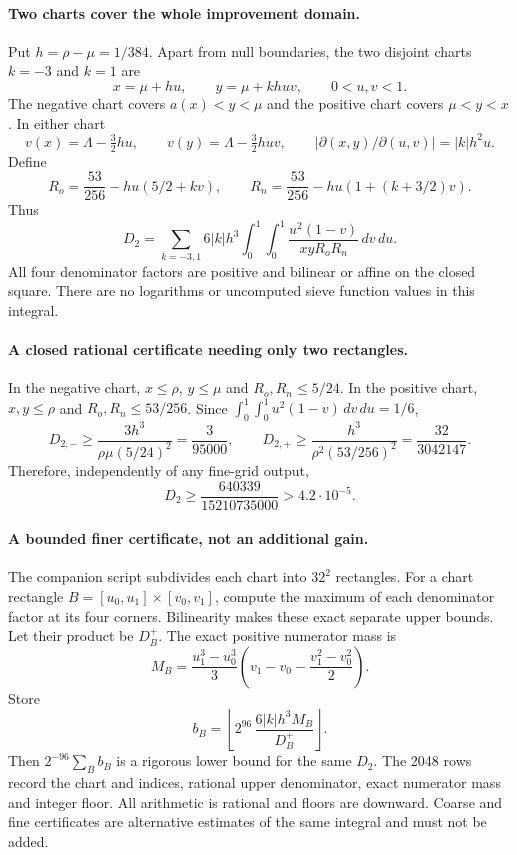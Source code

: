 \paragraph{Two charts cover the whole improvement domain.}
Put $h=\rho-\mu=1/384$. Apart from null boundaries, the two disjoint
charts $k=-3$ and $k=1$ are
\[
 x=\mu+hu,\qquad y=\mu+khuv,\qquad 0<u,v<1.
\]
The negative chart covers $a(x)<y<\mu$ and the positive chart covers
$\mu<y<x$. In either chart
\[
 v(x)=\Lambda-\tfrac32hu,\qquad
 v(y)=\Lambda-\tfrac32huv,\qquad
 |\partial(x,y)/\partial(u,v)|=|k|h^2u.
\]
Define
\[
 R_o=\frac{53}{256}-hu(5/2+kv),\qquad
 R_n=\frac{53}{256}-hu(1+(k+3/2)v).
\]
Thus
\begin{equation}\label{eq:second-prefix-chart-integral}
 D_2=\sum_{k=-3,1}6|k|h^3
 \int_0^1\int_0^1\frac{u^2(1-v)}{xyR_oR_n}\,dv\,du.
\end{equation}
All four denominator factors are positive and bilinear or affine
on the closed square. There are no logarithms or uncomputed sieve
function values in this integral.

\paragraph{A closed rational certificate needing only two rectangles.}
In the negative chart,
$x\le\rho$, $y\le\mu$ and $R_o,R_n\le5/24$.
In the positive chart,
$x,y\le\rho$ and $R_o,R_n\le53/256$.
Since $\int_0^1\int_0^1u^2(1-v)\,dv\,du=1/6$,
\[
 D_{2,-}\ge\frac{3h^3}{\rho\mu(5/24)^2}=\frac3{95000},
 \qquad
 D_{2,+}\ge\frac{h^3}{\rho^2(53/256)^2}=\frac{32}{3042147}.
\]
Therefore, independently of any fine-grid output,
\begin{equation}\label{eq:second-prefix-coarse-positive}
 \boxed{D_2\ge\frac{640339}{15210735000}>4.2\cdot10^{-5}.}
\end{equation}

\paragraph{A bounded finer certificate, not an additional gain.}
The companion script subdivides each chart into $32^2$ rectangles.
For a chart rectangle $B=[u_0,u_1]\times[v_0,v_1]$, compute the maximum
of each denominator factor at its four corners. Bilinearity makes
these exact separate upper bounds. Let their product be $D_B^+$.
The exact positive numerator mass is
\[
 M_B=\frac{u_1^3-u_0^3}{3}
       \left(v_1-v_0-\frac{v_1^2-v_0^2}{2}\right).
\]
Store
\[
 b_B=\left\lfloor 2^{96}\,
                 \frac{6|k|h^3 M_B}{D_B^+}\right\rfloor.
\]
Then $2^{-96}\sum_B b_B$ is a rigorous lower bound for the same
$D_2$. The 2048 rows record the chart and indices, rational upper
denominator, exact numerator mass and integer floor. All arithmetic
is rational and floors are downward. Coarse and fine certificates
are alternative estimates of the same integral and must not be added.

